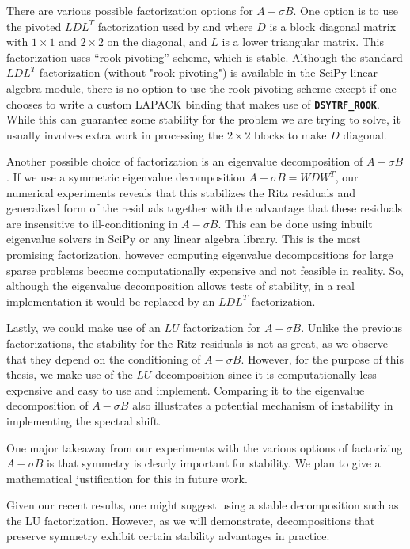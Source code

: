 There are various possible factorization options for $A-\sigma B$. One option is to use the pivoted $LDL^{T}$ factorization used by \cite{stewart2024spectraltransformationdensesymmetric} and \cite{Ericsson1980TheST} where $D$ is a block diagonal matrix with $1 \times 1$ and $2 \times 2$ on the diagonal, and $L$ is a lower triangular matrix. This factorization uses ``rook pivoting'' scheme, which is stable. Although the standard $LDL^T$ factorization (without "rook pivoting") is available in the SciPy linear algebra module, there is no option to use the rook pivoting scheme except if one chooses to write a custom LAPACK binding that makes use of \textbf{\texttt{DSYTRF\_ROOK}}. While this can guarantee some stability for the problem we are trying to solve, it usually involves extra work in processing the $2 \times 2$ blocks to make $D$ diagonal.

Another possible choice of factorization is an eigenvalue decomposition of $A - \sigma B$. If we use a symmetric eigenvalue decomposition $A- \sigma B = WDW^T$, our numerical experiments reveals that this stabilizes the Ritz residuals and generalized form of the residuals together with the advantage that these residuals are insensitive to ill-conditioning in $A-\sigma B$. This can be done using inbuilt eigenvalue solvers in SciPy or any linear algebra library. This is the most promising factorization, however computing eigenvalue decompositions for large sparse problems become computationally expensive and not feasible in reality. So, although the eigenvalue decomposition allows tests of stability, in a real implementation it would be replaced by an $LDL^T$ factorization.

Lastly, we could make use of an $LU$ factorization for $A-\sigma B$. Unlike the previous factorizations, the stability for the Ritz residuals is not as great, as we observe that they depend on the conditioning of $A-\sigma B$.  However, for the purpose of this thesis, we make use of the $LU$ decomposition since it is computationally less expensive and easy to use and implement. Comparing it to the eigenvalue decomposition of $A-\sigma B$ also illustrates a potential mechanism of instability in implementing the spectral shift.

One major takeaway from our experiments with the various options of factorizing $A-\sigma B$ is that symmetry is clearly important for stability. We plan to give a mathematical justification for this in future work.

Given our recent results, one might suggest using a stable decomposition such as the LU factorization. However, as we will demonstrate, decompositions that preserve symmetry exhibit certain stability advantages in practice.

